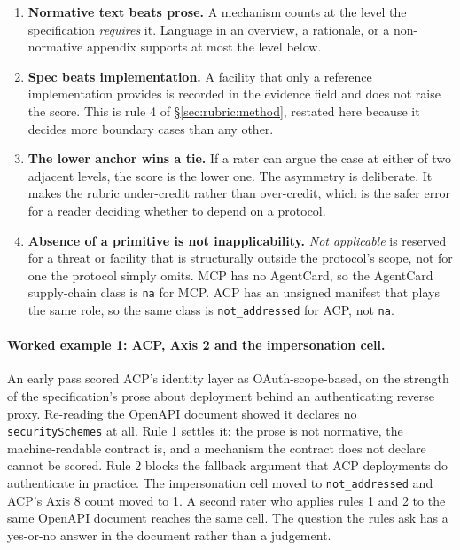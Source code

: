 \begin{enumerate}
  \item \textbf{Normative text beats prose.} A mechanism
    counts at the level the specification \emph{requires}
    it. Language in an overview, a rationale, or a
    non-normative appendix supports at most the level
    below.
  \item \textbf{Spec beats implementation.} A facility that
    only a reference implementation provides is recorded in
    the evidence field and does not raise the score. This
    is rule 4 of \S\ref{sec:rubric:method}, restated here
    because it decides more boundary cases than any other.
  \item \textbf{The lower anchor wins a tie.} If a rater
    can argue the case at either of two adjacent levels,
    the score is the lower one. The asymmetry is
    deliberate. It makes the rubric under-credit rather
    than over-credit, which is the safer error for a
    reader deciding whether to depend on a protocol.
  \item \textbf{Absence of a primitive is not
    inapplicability.} \emph{Not applicable} is reserved for
    a threat or facility that is structurally outside the
    protocol's scope, not for one the protocol simply
    omits. MCP has no AgentCard, so the AgentCard
    supply-chain class is \texttt{na} for MCP. ACP has an
    unsigned manifest that plays the same role, so the same
    class is \texttt{not\_addressed} for ACP, not
    \texttt{na}.
\end{enumerate}

\paragraph{Worked example 1: ACP, Axis 2 and the
impersonation cell.}
An early pass scored ACP's identity layer as
OAuth-scope-based, on the strength of the specification's
prose about deployment behind an authenticating reverse
proxy. Re-reading the OpenAPI document showed it declares
no \texttt{securitySchemes} at all. Rule 1 settles it: the
prose is not normative, the machine-readable contract is,
and a mechanism the contract does not declare cannot be
scored. Rule 2 blocks the fallback argument that ACP
deployments do authenticate in practice. The impersonation
cell moved to \texttt{not\_addressed} and ACP's Axis 8
count moved to 1. A second rater who applies rules 1 and 2
to the same OpenAPI document reaches the same cell. The
question the rules ask has a yes-or-no answer in the
document rather than a judgement.

